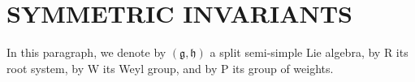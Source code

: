 \section{SYMMETRIC INVARIANTS}

In this paragraph, we denote by \((\mathfrak{g},\mathfrak{h})\) a split semi-simple Lie algebra, by R its root system, by W its Weyl group, and by P its group of weights.

